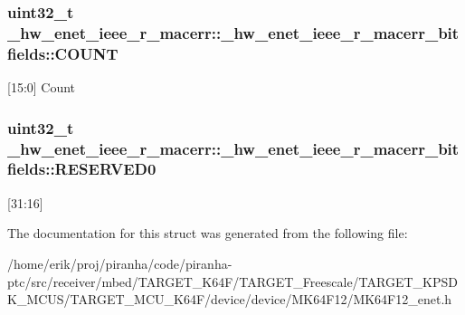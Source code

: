 \subsubsection[{\texorpdfstring{C\+O\+U\+NT}{COUNT}}]{\setlength{\rightskip}{0pt plus 5cm}uint32\+\_\+t \+\_\+hw\+\_\+enet\+\_\+ieee\+\_\+r\+\_\+macerr\+::\+\_\+hw\+\_\+enet\+\_\+ieee\+\_\+r\+\_\+macerr\+\_\+bitfields\+::\+C\+O\+U\+NT}\hypertarget{struct__hw__enet__ieee__r__macerr_1_1__hw__enet__ieee__r__macerr__bitfields_ad8268372f5ced873532222941ac693a4}{}\label{struct__hw__enet__ieee__r__macerr_1_1__hw__enet__ieee__r__macerr__bitfields_ad8268372f5ced873532222941ac693a4}
\mbox{[}15\+:0\mbox{]} Count 
\subsubsection[{\texorpdfstring{R\+E\+S\+E\+R\+V\+E\+D0}{RESERVED0}}]{\setlength{\rightskip}{0pt plus 5cm}uint32\+\_\+t \+\_\+hw\+\_\+enet\+\_\+ieee\+\_\+r\+\_\+macerr\+::\+\_\+hw\+\_\+enet\+\_\+ieee\+\_\+r\+\_\+macerr\+\_\+bitfields\+::\+R\+E\+S\+E\+R\+V\+E\+D0}\hypertarget{struct__hw__enet__ieee__r__macerr_1_1__hw__enet__ieee__r__macerr__bitfields_a016fe1c8c4b6edabb552b83d798725b0}{}\label{struct__hw__enet__ieee__r__macerr_1_1__hw__enet__ieee__r__macerr__bitfields_a016fe1c8c4b6edabb552b83d798725b0}
\mbox{[}31\+:16\mbox{]} 

The documentation for this struct was generated from the following file\+:\begin{DoxyCompactItemize}
\item 
/home/erik/proj/piranha/code/piranha-\/ptc/src/receiver/mbed/\+T\+A\+R\+G\+E\+T\+\_\+\+K64\+F/\+T\+A\+R\+G\+E\+T\+\_\+\+Freescale/\+T\+A\+R\+G\+E\+T\+\_\+\+K\+P\+S\+D\+K\+\_\+\+M\+C\+U\+S/\+T\+A\+R\+G\+E\+T\+\_\+\+M\+C\+U\+\_\+\+K64\+F/device/device/\+M\+K64\+F12/M\+K64\+F12\+\_\+enet.\+h\end{DoxyCompactItemize}
